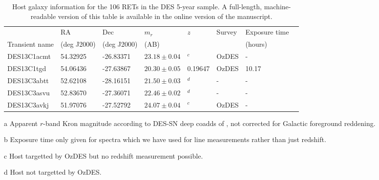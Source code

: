 \documentclass[fleqn,usenatbib,]{mnras}
\newcommand{\replyref}[1]{\color{magenta}#1 \color{black}}
\begin{document}
\begin{table}
\caption{Host galaxy information for the 106 RETs in the DES 5-year sample. A full-length, machine-readable version of this table is available in the online version of the manuscript.}

\begin{threeparttable}
\begin{tabular}{llllllll}

\toprule
{} &       RA &       Dec &    $m_r$\tnote{a}  &     $z$ &     Survey & Exposure time \tnote{b} \\
Transient name &  (\replyref{deg }J2000)  & (\replyref{deg} J2000)  &  (AB)    &         &         &   (hours)         &               \\
\midrule
DES13C1acmt    & 54.32925 & -26.83371 & $23.18 \pm 0.04$ &    $^c$ &      OzDES &             - \\
DES13C1tgd     & 54.06436 & -27.63867 & $20.30 \pm 0.05$ & 0.19647 &      OzDES &      10.17 \\
DES13C3abtt    & 52.62108 & -28.16151 & $21.50 \pm 0.03$ &    $^d$ &          - &             - \\
DES13C3asvu    & 52.83670 & -27.36071 & $22.46 \pm 0.02$ &    $^d$ &          - &             - \\
DES13C3avkj    & 51.97076 & -27.52792 & $24.07 \pm 0.04$ &    $^c$ &      OzDES &             - \\

\bottomrule
\end{tabular}
\begin{tablenotes}
\item[a] Apparent $r$-band Kron magnitude according to DES-SN deep coadds of , not corrected for Galactic foreground reddening.
\item[b] Exposure time only given for spectra which we have used for line measurements rather than just redshift.
\item[c] Host targetted by OzDES but no redshift measurement possible.
\item[d] Host not targetted by OzDES.
\end{tablenotes}
\end{threeparttable}
\label{tab:obs}
\end{table}
\end{document}
